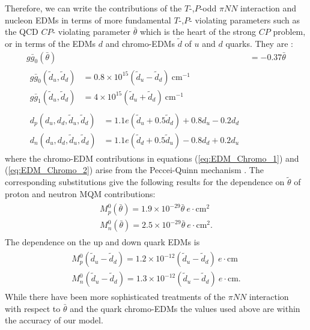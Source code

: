 \documentclass[10pt,a4paper, twoside, openright]{report}
\begin{document}
Therefore, we can write the contributions of the $T$-,$P$-odd $\pi NN$ interaction and nucleon EDMs in terms of more fundamental $T$-,$P$- violating parameters such as the  QCD $CP$- violating parameter $\bar{\theta}$ which is the heart of the strong $CP$ problem,  or in terms of the EDMs  $d$ and chromo-EDMs $\tilde{d}$ of $u$ and $d$ quarks. They are \cite{ Crewther1979,Pospelov1999, Pospelov2005, Alexandrou2017, JLQCD, PNDME2018}:
\begin{align}
g\bar{g}_0(\bar{\theta})&= -0.37 \bar{\theta} \\
\begin{split}
g\bar{g}_0(\tilde{d}_u, \tilde{d}_d)&= 0.8\times 10^{15} \left(\tilde{d}_u - \tilde{d}_{d}\right) \ \text{cm}^{-1} \\
g\bar{g}_1(\tilde{d}_u, \tilde{d}_d)&= 4\times 10^{15} \left(\tilde{d}_u + \tilde{d}_{d}\right) \ \text{cm}^{-1}
\end{split} \label{eq:EDM_Chromo_1} \\
\begin{split}
d_{p}(d_u, d_d, \tilde{d}_u, \tilde{d}_d) &= 1.1e\left(\tilde{d}_u + 0.5\tilde{d}_{d}\right) + 0.8 d_u - 0.2d_d \\
d_{n}(d_u, d_d, \tilde{d}_u, \tilde{d}_d) &= 1.1e\left(\tilde{d}_d + 0.5\tilde{d}_{u}\right) - 0.8 d_d + 0.2d_u
\end{split} \label{eq:EDM_Chromo_2}
\end{align}
where the chromo-EDM contributions in equations (\ref{eq:EDM_Chromo_1}) and (\ref{eq:EDM_Chromo_2}) arise from the Peccei-Quinn mechanism \cite{Peccei1977, Pospelov2005}. 
The corresponding substitutions give the following results for the dependence on $\tilde{\theta}$ of  proton and neutron MQM contributions:
\begin{align}
\begin{split}
M_{p}^0(\bar{\theta}) = 1.9 \times 10^{-29}\bar{\theta} \ e\cdot\text{cm}^2 \\
M_{n}^0(\bar{\theta}) = 2.5 \times 10^{-29}\bar{\theta} \ e\cdot\text{cm}^2.
\end{split}
\end{align}
The dependence  on the up and down quark EDMs is
\begin{align} 
\begin{split}
M_{p}^0(\tilde{d}_u - \tilde{d}_d) = 1.2 \times 10^{-12}(\tilde{d}_u - \tilde{d}_d) \ e\cdot\text{cm} \\
M_{n}^0(\tilde{d}_u - \tilde{d}_d) = 1.3 \times 10^{-12}(\tilde{d}_u - \tilde{d}_d) \ e\cdot\text{cm}. 
\end{split}
\end{align}
While there have been more sophisticated treatments of the  $\pi NN$ interaction with respect to $\bar{\theta}$\cite{Vries2015, Engel2013, Yamanaka2017, Chupp2018} and the quark chromo-EDMs \cite{Fuyuto2013, Seng2018, Engel2013, Yamanaka2017, Chupp2018} the values used above are within the accuracy of our model.  
\end{document}
